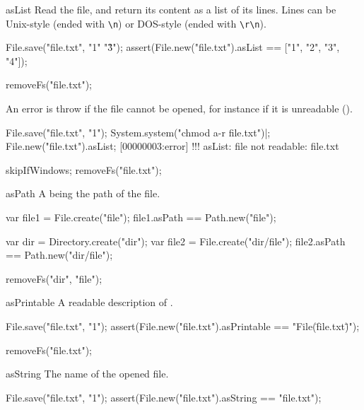 \begin{urbiscriptapi}
\item[asList] Read the file, and return its content as a list of its lines.
  Lines can be Unix-style (ended with \lstinline|\n|) or DOS-style (ended
  with \lstinline|\r\n|).
\begin{urbiscript}
File.save("file.txt", "1\n"  "3\r{}\r\n");
assert(File.new("file.txt").asList == ["1", "2", "3", "4"]);
\end{urbiscript}
\begin{urbicomment}
removeFs("file.txt");
\end{urbicomment}

An error is throw if the file cannot be opened, for instance if it is
unreadable ().

\begin{urbiscript}[firstnumber=1]
File.save("file.txt", "1\n");
System.system("chmod a-r file.txt")|;
File.new("file.txt").asList;
[00000003:error] !!! asList: file not readable: file.txt
\end{urbiscript}
\begin{urbicomment}
skipIfWindows;
removeFs("file.txt");
\end{urbicomment}

\item[asPath] A  being the path of the file.
\begin{urbiassert}[firstnumber=1]
var file1 = File.create("file");
file1.asPath == Path.new("file");

var dir = Directory.create("dir");
var file2 = File.create("dir/file");
file2.asPath == Path.new("dir/file");
\end{urbiassert}
\begin{urbicomment}
removeFs("dir", "file");
\end{urbicomment}


\item[asPrintable]
  A readable description of \this.
\begin{urbiscript}
File.save("file.txt", "1\n");
assert(File.new("file.txt").asPrintable == "File(\"file.txt\")");
\end{urbiscript}
\begin{urbicomment}
removeFs("file.txt");
\end{urbicomment}


\item[asString]
  The name of the opened file.
\begin{urbiscript}
File.save("file.txt", "1\n");
assert(File.new("file.txt").asString == "file.txt");
\end{urbiscript}



\end{urbiscriptapi}
